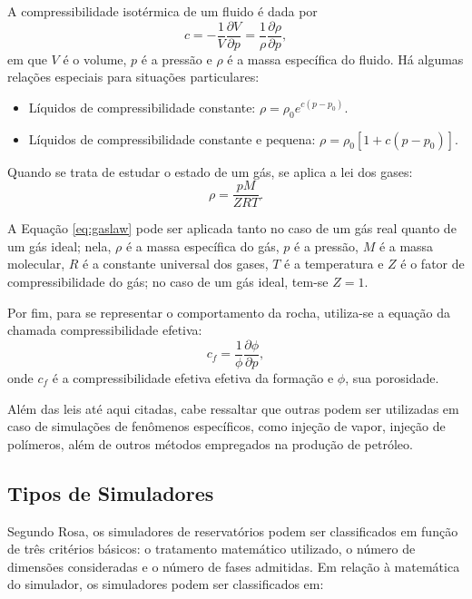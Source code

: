 \begin{definition}
A compressibilidade isot\'{e}rmica de um fluido \'{e} dada por
\begin{equation}
	c = -\frac{1}{V}\frac{\partial V}{\partial p} = \frac{1}{\rho}\frac{\partial \rho}{\partial p},
\end{equation}
em que $V$ \'{e} o volume, $p$ \'{e} a press\~{a}o e $\rho$ \'{e} a massa espec\'{i}fica do fluido. H\'{a} algumas rela\c{c}\~{o}es especiais para situa\c{c}\~{o}es particulares:
\begin{itemize}
\item L\'{i}quidos de compressibilidade constante: $\rho = \rho_0 e^{c(p-p_0)}$.
\item L\'{i}quidos de compressibilidade constante e pequena: $\rho = \rho_0 \left[1+c\left(p-p_0\right)\right]$.
\end{itemize}
\end{definition}

Quando se trata de estudar o estado de um g\'{a}s, se aplica a lei dos gases:
\begin{equation}\label{eq:gaslaw}
	\rho = \frac{pM}{ZRT}.
\end{equation}

A Equa\c{c}\~{a}o \eqref{eq:gaslaw} pode ser aplicada tanto no caso de um g\'{a}s real quanto de um g\'{a}s ideal; nela, $\rho$ \'{e} a massa espec\'{i}fica do g\'{a}s, $p$ \'{e} a press\~{a}o, $M$ \'{e} a massa molecular, $R$ \'{e} a constante universal dos gases, $T$ \'{e} a temperatura e $Z$ \'{e} o fator de compressibilidade do g\'{a}s; no caso de um g\'{a}s ideal, tem-se $Z = 1$.

Por fim, para se representar o comportamento da rocha, utiliza-se a equa\c{c}\~{a}o da chamada compressibilidade efetiva:
\begin{equation}
	c_f = \frac{1}{\phi} \frac{\partial\phi}{\partial p},
\end{equation}
onde $c_f$ \'{e} a compressibilidade efetiva efetiva da forma\c{c}\~{a}o e $\phi$, sua porosidade.

Al\'{e}m das leis at\'{e} aqui citadas, cabe ressaltar que outras podem ser utilizadas em caso de simula\c{c}\~{o}es de fen\^{o}menos espec\'{i}ficos, como inje\c{c}\~{a}o de vapor, inje\c{c}\~{a}o de pol\'{i}meros, al\'{e}m de outros m\'{e}todos empregados na produ\c{c}\~{a}o de petr\'{o}leo.

\subsection{Tipos de Simuladores}
Segundo Rosa, os simuladores de reservat\'{o}rios podem ser classificados em fun\c{c}\~{a}o de tr\^{e}s crit\'{e}rios b\'{a}sicos: o tratamento matem\'{a}tico utilizado, o n\'{u}mero de dimens\~{o}es consideradas e o n\'{u}mero de fases admitidas. Em rela\c{c}\~{a}o \`{a} matem\'{a}tica do simulador, os simuladores podem ser classificados em: 

